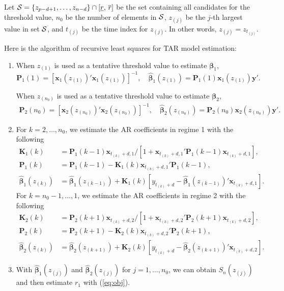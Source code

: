 Let ${\cal S}=\{{z}_{p-d+1},\ldots,{z}_{n-d}\}\cap [\underline{r},\, \overline{r}]$ be the set containing all candidates for the threshold value, $n_0$ be the number of elements in $\cal S$, ${z}_{(j)}$ be the $j$-th largest value in set $\cal S$, and $t_{(j)}$ be the time index for ${z}_{(j)}$. In other words, ${z}_{(j)}=z_{t_{(j)}}$.


Here is the algorithm of recursive least squares for TAR model estimation:
\begin{enumerate}
\item When ${z}_{(1)}$ is used as a tentative threshold value to estimate $\boldsymbol{\beta}_1$,
\[
{\mathbf P}_1(1)=[{\mathbf x}_1({z}_{(1)})' {\mathbf x}_1({z}_{(1)})]^{-1}, \quad \hat{\boldsymbol{\beta}}_1({z}_{(1)})={\mathbf P}_1(1) {\mathbf x}_1({z}_{(1)}){\mathbf y}'.
\]

When ${z}_{(n_0)}$ is used as a tentative threshold value to estimate $\boldsymbol{\beta}_2$,
\begin{align*}
{\mathbf P}_2(n_0)=[{\mathbf x}_{2}({z}_{(n_0)})' {\mathbf x}_2({z}_{(n_0)})]^{-1}, \quad  \hat{\boldsymbol{\beta}}_2({z}_{(n_0)})={\mathbf P}_2({n_0}){\mathbf x}_{2}({z}_{(n_0)}){\mathbf y}'.
\end{align*}
\item For $k=2,\ldots,n_0$, we estimate the AR coefficients in regime 1 with the following
\begin{align*}
{\mathbf K}_1({k})&={\mathbf P}_1(k-1) {\mathbf x}_{t_{(k)}+d,1}/[1+{\mathbf x}_{t_{(k)}+d,1}'{\mathbf P}_1(k-1){\mathbf x}_{t_{(k)}+d,1}], \\
{\mathbf P}_1(k)&={\mathbf P}_1(k-1)-{\mathbf K}_1(k) {\mathbf x}_{t_{(k)}+d,1}' {\mathbf P}_1(k-1),\\
\hat{\boldsymbol{\beta}}_1({z}_{(k)})&=\hat{\boldsymbol{\beta}}_1({z}_{(k-1)})+{\mathbf K}_1(k)[y_{t_{(k)}+d}- \hat{\boldsymbol{\beta}}_1(z_{(k-1)})'{\mathbf x}_{t_{(k)}+d,1}].
\end{align*}
For $k=n_0-1,\ldots,1$, we estimate the AR coefficients in regime 2 with the following
\begin{align*}
{\mathbf K}_2({k})&={\mathbf P}_2(k+1) {\mathbf x}_{t_{(k)}+d,2}/[1+{\mathbf x}_{t_{(k)}+d,2}'{\mathbf P}_2(k+1){\mathbf x}_{t_{(k)}+d,2}], \\
{\mathbf P}_2(k)&={\mathbf P}_2(k+1)-{\mathbf K}_2(k) {\mathbf x}_{t_{(k)}+d,2}' {\mathbf P}_2(k+1),\\
\hat{\boldsymbol{\beta}}_2({z}_{(k)})&=\hat{\boldsymbol{\beta}}_2({z}_{(k+1)})+{\mathbf K}_2(k)[y_{t_{(k)}+d}- \hat{\boldsymbol{\beta}}_2(z_{(k+1)})'{\mathbf x}_{t_{(k)}+d,2}].
\end{align*}
\item With $\hat{\boldsymbol{\beta}}_1(z_{(j)})$ and $\hat{\boldsymbol{\beta}}_2(z_{(j)})$ for $j=1,\ldots, n_0$, we can obtain $S_n(z_{(j)})$ and then estimate $r_1$ with (\ref{eq:obj}).
\end{enumerate}



